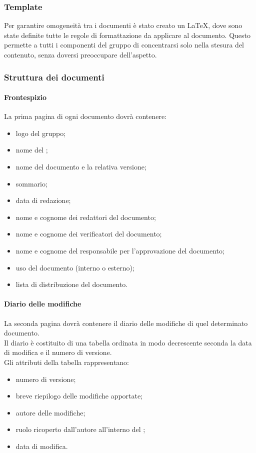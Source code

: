 \subsubsection{Template}
Per garantire omogeneità tra i documenti è stato creato un  \LaTeX{}, dove sono state definite tutte le regole di formattazione da applicare al documento. Questo permette a tutti i componenti del gruppo di concentrarsi solo nella stesura del contenuto, senza doversi preoccupare dell'aspetto. 
\subsubsection{Struttura dei documenti}
 \paragraph{Frontespizio} 
La prima pagina di ogni documento dovrà contenere:
\begin{itemize}
	\item logo del gruppo;
	\item nome del ;
	\item nome del documento e la relativa versione;
	\item sommario;
	\item data di redazione;
	\item nome e cognome dei redattori del documento;
	\item nome e cognome dei verificatori del documento;
	\item nome e cognome del responsabile per l'approvazione del documento;
	\item uso del documento (interno o esterno);
	\item lista di distribuzione del documento.
\end{itemize}
 \paragraph{Diario delle modifiche}
 La seconda pagina dovrà contenere il diario delle modifiche di quel determinato documento.\\
 Il diario è costituito di una tabella ordinata in modo decrescente seconda la data di modifica e il numero di versione.\\
 Gli attributi della tabella rappresentano:
 \begin{itemize}
 	\item numero di versione;
 	\item breve riepilogo delle modifiche apportate;
 	\item autore delle modifiche;
 	\item ruolo ricoperto dall'autore all'interno del ;
 	\item data di modifica.
 \end{itemize}
